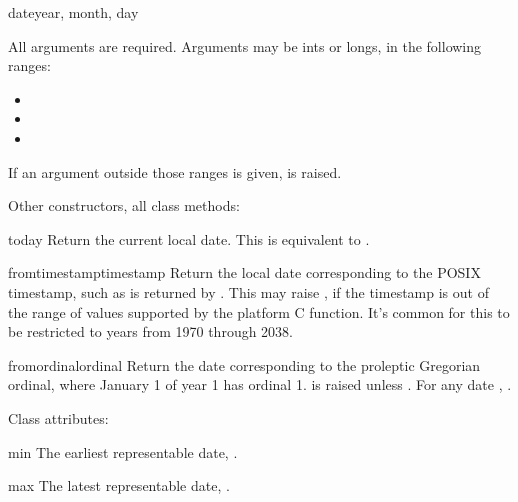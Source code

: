\begin{funcdesc}{date}{year, month, day}

    All arguments are required.  Arguments may be ints or longs, in the
    following ranges:

\begin{itemize}
  \item {}
  \item {}
  \item {}
\end{itemize}

If an argument outside those ranges is given, 
is raised.
\end{funcdesc}

Other constructors, all class methods:

\begin{methoddesc}{today}{}
    Return the current local date.  This is equivalent to
    .
\end{methoddesc}

\begin{methoddesc}{fromtimestamp}{timestamp}
    Return the local date corresponding to the POSIX timestamp, such
    as is returned by .  This may raise
    , if the timestamp is out of the range of
    values supported by the platform C 
    function.  It's common for this to be restricted to years from 1970
    through 2038.
\end{methoddesc}

\begin{methoddesc}{fromordinal}{ordinal}
    Return the date corresponding to the proleptic Gregorian ordinal,
    where January 1 of year 1 has ordinal 1.  
    is raised unless .  For any
    date , .
\end{methoddesc}

Class attributes:

\begin{memberdesc}{min}
        The earliest representable date, .
\end{memberdesc}

\begin{memberdesc}{max}
        The latest representable date, .
\end{memberdesc}

